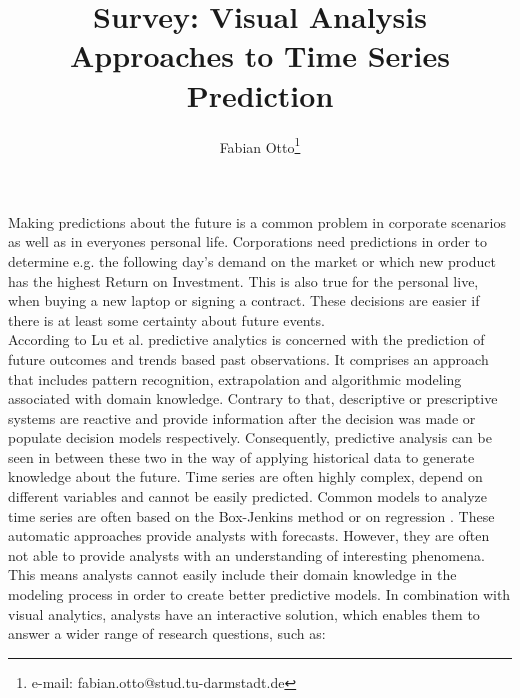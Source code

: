 \documentclass[electronic]{vgtc}             %
\title{Survey: Visual Analysis Approaches to Time Series Prediction}
\author{Fabian Otto\thanks{e-mail: fabian.otto@stud.tu-darmstadt.de}}
\affiliation{\scriptsize Technische Universit\"at Darmstadt}
\begin{document}

\maketitle

Making predictions about the future is a common problem in corporate scenarios as well as in everyones personal life. 
Corporations need predictions in order to determine e.g. the following day's demand on the market or which new product has the highest Return on Investment.
This is also true for the personal live, when buying a new laptop or signing a contract.
These decisions are easier if there is at least some certainty about future events.\\
According to Lu et al. \cite{Lu:2017} predictive analytics is concerned with the prediction of future outcomes and trends based past observations. 
It comprises an approach that includes pattern recognition, extrapolation and algorithmic modeling associated with domain knowledge.
Contrary to that, descriptive or prescriptive systems are reactive and provide information after the decision was made or populate decision models respectively.
Consequently, predictive analysis can be seen in between these two in the way of applying historical data to generate knowledge about the future.
Time series are often highly complex, depend on different variables and cannot be easily predicted. 
Common models to analyze time series are often based on the Box-Jenkins method \cite{box:2015} or on regression \cite{draper:2014}.
These automatic approaches provide analysts with forecasts.
However, they are often not able to provide analysts with an understanding of interesting phenomena.
This means analysts cannot easily include their domain knowledge in the modeling process in order to create better predictive models.
In combination with visual analytics, analysts have an interactive solution, which enables them to answer a wider range of research questions, such as: 
\end{document}
